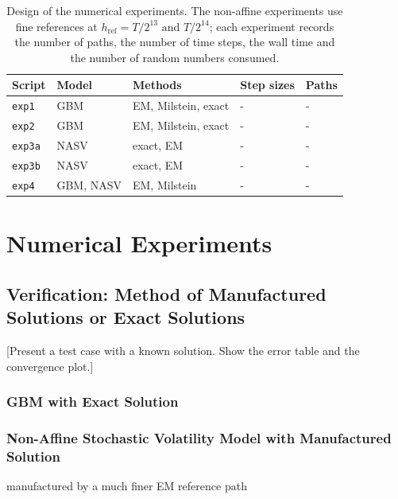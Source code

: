 \documentclass[11pt,a4paper]{article}
\theoremstyle{definition}
\theoremstyle{remark}
\begin{document}
\begin{table}[H]
\centering
\small
\begin{tabular}{lllll}
\toprule
\textbf{Script} & \textbf{Model} & \textbf{Methods} & \textbf{Step sizes}
    & \textbf{Paths} \\
\midrule
\texttt{exp1} & GBM        & EM, Milstein, exact
              & - & - \\
\texttt{exp2} & GBM        & EM, Milstein, exact
              & - & - \\
\texttt{exp3a} & NASV        & exact, EM
              & - & - \\
\texttt{exp3b} & NASV        & exact, EM
              & - & - \\
\texttt{exp4} & GBM, NASV        & EM, Milstein
              & - & - \\
\bottomrule
\end{tabular}
\caption{Design of the numerical experiments. The non-affine experiments use
fine references at $h_{\mathrm{ref}} = T/2^{13}$ and $T/2^{14}$; each experiment
records the number of paths, the number of time steps, the wall time and the
number of random numbers consumed.}
\label{tab:experiment-design}
\end{table}

\newpage
\section{Numerical Experiments} \label{sec:experiments}

\subsection{Verification: Method of Manufactured Solutions or Exact Solutions}
[Present a test case with a known solution. Show the error table and the
convergence plot.]

\subsubsection{GBM with Exact Solution}

\subsubsection{Non-Affine Stochastic Volatility Model with Manufactured Solution}
manufactured by a much finer EM reference path
\end{document}
